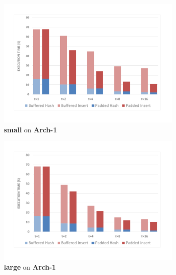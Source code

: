 \documentclass[10pt, conference, compsocconf]{IEEEtran}
\begin{document}
\begin{figure}[htbp]
\begin{subfigure}[t]{0.47\textwidth}
\includegraphics[width=\linewidth]{expfigs/8x211gandalf.pdf}
\caption{{\bf small} on {\bf Arch-1}}
\label{fig:8x211arch1}
\end{subfigure}
\begin{subfigure}[t]{0.47\textwidth}\hspace*{-10ex}
\includegraphics[width=\linewidth]{expfigs/8x2003gandalf.pdf}
\caption{{\bf large} on {\bf Arch-1}}
\label{fig:8x2003arch1}
\end{subfigure}
\begin{subfigure}[t]{0.47\textwidth}

\end{subfigure}
\end{figure}
\end{document}
